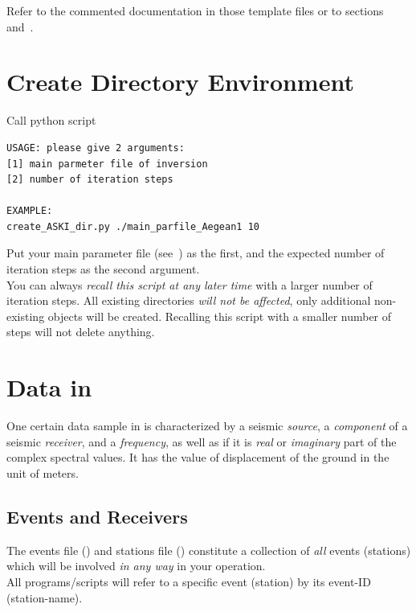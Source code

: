 Refer to the commented documentation in those template files or 
to sections~ and~.
%
\section{Create Directory Environment} \label{basic_steps,sec:create_dir}
%
Call python script 
\begin{lstlisting}
USAGE: please give 2 arguments:
[1] main parmeter file of inversion
[2] number of iteration steps

EXAMPLE:
create_ASKI_dir.py ./main_parfile_Aegean1 10
\end{lstlisting}
Put your main parameter file (see~) as the first, and the expected 
number of iteration steps as the second argument. \\
You can always \emph{recall this script at any later time} with a larger number of iteration steps. 
All existing directories \emph{will not be affected}, only additional non-existing objects will be 
created. Recalling this script with a smaller number of steps will not delete anything.
%
\section{Data in \ASKI} \label{basic_steps,sec:data_general}
%
One certain data sample in \ASKI is characterized by a seismic \emph{source}, a \emph{component} 
of a seismic \emph{receiver}, and a \emph{frequency}, as well as if it is \emph{real} or \emph{imaginary} part 
of the complex spectral values. It has the value of displacement of the ground in the unit of meters.
%
\subsection*{Events and Receivers}
%
The events file () and stations file () constitute a
collection of \emph{all} events (stations) which will be involved \emph{in any way} in your \ASKI operation.\\
All programs/scripts will refer to a specific event (station) by its event-ID (station-name).
%
